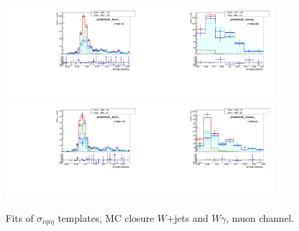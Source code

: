 \begin{figure}[htb]
\begin{center}
   \includegraphics[width=0.45\textwidth]{../figs/figs_v11/MUON_WGamma/MCclosureWjetsPlusWg/c_TEMPL_SIHIH_UNblind__phoEt25to30__Barrel__RooFit_MCclosure.pdf}\includegraphics[width=0.45\textwidth]{../figs/figs_v11/MUON_WGamma/MCclosureWjetsPlusWg/c_TEMPL_SIHIH_UNblind__phoEt25to30__Endcap__RooFit_MCclosure.pdf}\\
   \includegraphics[width=0.45\textwidth]{../figs/figs_v11/MUON_WGamma/MCclosureWjetsPlusWg/c_TEMPL_SIHIH_UNblind__phoEt30to35__Barrel__RooFit_MCclosure.pdf}\includegraphics[width=0.45\textwidth]{../figs/figs_v11/MUON_WGamma/MCclosureWjetsPlusWg/c_TEMPL_SIHIH_UNblind__phoEt30to35__Endcap__RooFit_MCclosure.pdf}\\
  \label{fig:templateFits_MCclosureWjetsPlusWg_SIHIH_MUON_1}
  \caption{Fits of $\sigma_{i \eta i \eta}$ templates, MC closure $W$+jets and $W\gamma$, muon channel.}
  \end{center}
\end{figure}


